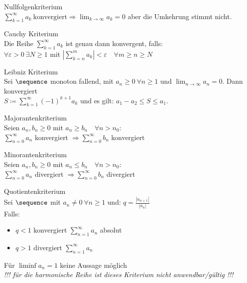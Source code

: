 \begin{concept} {Nullfolgenkriterium}\\
    $\sum_{k=1}^\infty a_k~\text{konvergiert} \Rightarrow \lim_{k \to \infty} a_k = 0$ aber die Umkehrung stimmt nicht.
\end{concept}
\begin{concept} {Cauchy Kriterium}\\
    Die Reihe $\sum_{k=1}^\infty a_k$ ist genau dann konvergent, falls:\\
    $\forall \varepsilon > 0 ~\exists N \geq 1$ mit $\left|\sum_{k=n}^m a_k \right| < \varepsilon \quad \forall m \geq n \geq N$
\end{concept}
\begin{concept} {Leibniz Kriterium}\\
    Sei $\sequence$ monoton fallend, mit $a_n \geq 0~\forall n \geq 1$ und $\lim_{n \to \infty} a_n = 0$. Dann konvergiert\\
    $S \coloneqq \sum_{k = 1}^{\infty} (-1)^{k+1} a_k$
    und es gilt: $a_1 - a_2 \leq S \leq a_1$.
\end{concept}
\begin{concept} {Majorantenkriterium}\\
    Seien $a_n, b_n \geq 0$ mit $a_n \geq b_n \quad \forall n > n_0$:\\
    $\sum_{n=0}^\infty a_n$ konvergiert $\Rightarrow \sum_{n=0}^\infty b_n$ konvergiert 
\end{concept}
\begin{concept} {Minorantenkriterium}\\
    Seien $a_n, b_n \geq 0$ mit $a_n \leq b_n \quad \forall n > n_0$:\\
    $\sum_{n=0}^\infty a_n$ divergiert $\Rightarrow \sum_{n=0}^\infty b_n$ divergiert 
\end{concept}
\begin{concept} {Quotientenkriterium}\\
    Sei $\sequence$ mit $a_n \neq 0~\forall n \geq 1$ und: $q = \frac{|a_{n + 1}|}{|a_n|}$\\
    Falls:
    \begin{itemize}
        \item $q < 1$ konvergiert $\sum_{n=1}^\infty a_n$ absolut
        \item $q > 1$ divergiert $\sum_{n=1}^\infty a_n$
    \end{itemize}
    Für $\liminf a_n = 1$ keine Aussage möglich\\
    \emph{!!! für die harmonische Reihe ist dieses Kriterium nicht anwendbar/gültig !!!}
\end{concept}
